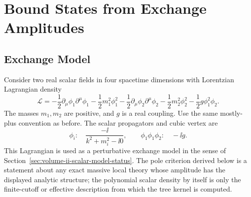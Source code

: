 \chapter{Bound States from Exchange Amplitudes}
\label{ch:volume-ii-bound-states-exchange}
\ConventionsLorentzian


\section{Exchange Model}

Consider two real scalar fields in four spacetime dimensions with Lorentzian
Lagrangian density
\[
  \mathcal L
  =
  -\frac12\partial_\mu\phi_1\partial^\mu\phi_1
  -\frac12m_1^2\phi_1^2
  -\frac12\partial_\mu\phi_2\partial^\mu\phi_2
  -\frac12m_2^2\phi_2^2
  -\frac12g\phi_1^2\phi_2 .
\]
The masses \(m_1,m_2\) are positive, and \(g\) is a real coupling. Use the
same mostly-plus convention as before. The scalar propagators and cubic
vertex are
\[
  \phi_i:\quad
  \frac{-\ii}{k^2+m_i^2-\ii0},
  \qquad
	  \phi_1\phi_1\phi_2:\quad -\ii g .
\]
This Lagrangian is used as a perturbative exchange model in the sense of
Section~\ref{sec:volume-ii-scalar-model-status}.  The pole criterion derived
below is a statement about any exact massive local theory whose amplitude has
the displayed analytic structure; the polynomial scalar density by itself is
only the finite-cutoff or effective description from which the tree kernel is
computed.

